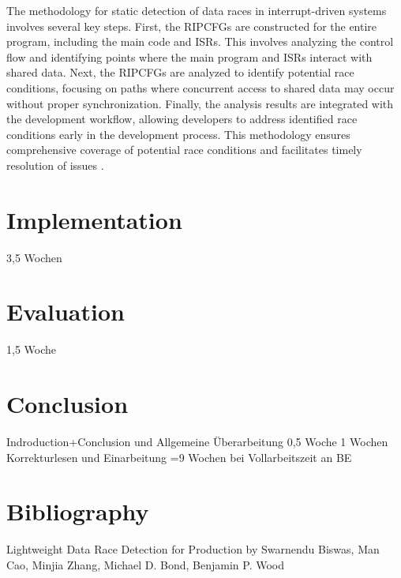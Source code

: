 \documentclass[
fancyheadings, %
%
%
]{stsreprt}
\begin{document}
{		The methodology for static detection of data races in interrupt-driven systems involves several key steps. First, the RIPCFGs are constructed for the entire program, including the main code and ISRs. This involves analyzing the control flow and identifying points where the main program and ISRs interact with shared data. Next, the RIPCFGs are analyzed to identify potential race conditions, focusing on paths where concurrent access to shared data may occur without proper synchronization. Finally, the analysis results are integrated with the development workflow, allowing developers to address identified race conditions early in the development process. This methodology ensures comprehensive coverage of potential race conditions and facilitates timely resolution of issues \cite{wang2020}.
		
		
		
		
		
		\chapter{Implementation}
		3,5 Wochen
		\chapter{Evaluation}
		1,5 Woche 
		\chapter{Conclusion}
		Indroduction+Conclusion und Allgemeine Überarbeitung 0,5 Woche
		1 Wochen Korrekturlesen und Einarbeitung
		=9 Wochen bei Vollarbeitszeit an BE
		\appendix
	}
	\backmatter{}
	\chapter{Bibliography}
	Lightweight Data Race Detection for Production by Swarnendu Biswas, Man Cao, Minjia Zhang, Michael D. Bond, Benjamin P. Wood
	
\end{document}
